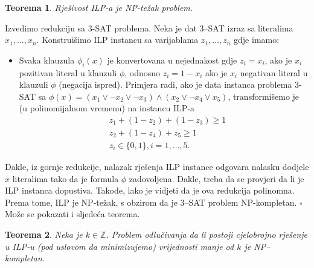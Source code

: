 \documentclass[a4paper, utf8, 11pt, colorlinks]{book}
\newtheorem{thm}{Teorema}
\newenvironment{proof}{{Dokaz:}}{\hfill$\square$}
\begin{document}
   \begin{thm}
   	  Rješivost ILP-a je NP-težak problem.
   \end{thm}
   \begin{proof}
   	   Izvedimo redukciju sa 3-SAT problema. Neka je dat 3--SAT izraz sa literalima  
   	   $x_1,\ldots, x_n$.  Konstruišimo ILP instancu sa varijablama $z_1, \ldots, z_n$ gdje imamo:
   	   \begin{itemize}
   	   	   \item Svaka klauzula $\phi_i(x)$ je konvertovana u nejednakost gdje
   	   	      $z_i = x_i$, ako je $x_i$ pozitivan literal u klauzuli $\phi$, odnosno $z_i = 1 - x_i$ ako je $x_i$ negativan literal u klauzuli $\phi$ (negacija ispred). Primjera radi, ako je data instanca problema 3-SAT sa 
   	   	      $\phi(x) = (x_1 \vee \neg x_2 \vee \neg x_3) \wedge ( x_2 \vee \neg x_4 \vee x_5 )$, transformišemo je (u polinomijalnom vremenu) na instancu ILP-a
   	   	      \begin{align*}
   	   	         	 &z_1 + (1- z_2) + (1 - z_3 ) \geq 1 \\
   	   	         	 &z_2 + (1-z_4)  + z_5 \geq 1 \\
   	   	         	 & z_i \in \{0,1\}, i=1,\ldots,5.
   	   	      \end{align*} 
   	   \end{itemize}
   	   Dakle, iz gornje redukcije, nalazak rješenja ILP instance odgovara nalasku dodjele $\overline{x}$ literalima tako da je formula $\phi$ zadovoljena. Dakle, treba da se provjeri da li je ILP instanca dopustiva. Takođe, lako je vidjeti da je ova redukcija polinomna. Prema tome, ILP je NP-težak, s obzirom da je 3--SAT problem NP-kompletan. 
   \end{proof} \\
 Može se pokazati i sljedeća teorema.
 \begin{thm} Neka je $k\in \mathbb{Z}$.
 	 Problem odlučivanja da li postoji cjelobrojno rješenje u ILP-u (pod uslovom da minimizujemo)   vrijednosti manje od $k$ je NP--kompletan. 
 \end{thm}
 
\end{document}
